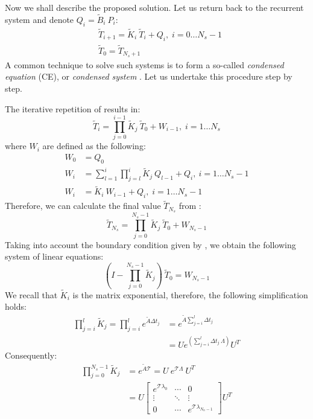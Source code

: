 Now we shall describe the proposed solution. Let us return back to the recurrent system and denote $Q_i = \tilde{B}_i \: P_i$:
\begin{align}
  & \tilde{T}_{i + 1} = \tilde{K}_i \: \tilde{T}_i + Q_i, \; i = 0 \dots N_s - 1 \label{eq:ce-recurrent} \\
  & \tilde{T}_0 = \tilde{T}_{N_s + 1} \nonumber
\end{align}
A common technique to solve such systems is to form a so-called \emph{condensed equation} (CE), or \emph{condensed system} \cite{stoer2002}. Let us undertake this procedure step by step.

The iterative repetition of  results in:
\begin{equation} \label{eq:y-recurrent}
  \tilde{T}_i = \prod_{j = 0}^{i - 1} \tilde{K}_j \: \tilde{T}_0 + W_{i - 1}, \; i = 1 \dots N_s
\end{equation}
where $W_i$ are defined as the following:
\begin{align}
  W_0 & = Q_0 \nonumber \\
  W_i & = \sum_{l = 1}^i \prod_{j = l}^i \tilde{K}_j \: Q_{l - 1} + Q_i, \: i = 1 \dots N_s - 1 \nonumber \\
  W_i & = \tilde{K}_i \: W_{i - 1} + Q_i, \; i = 1 \dots N_s - 1 \label{eq:p-recurrent}
\end{align}
Therefore, we can calculate the final value $\tilde{T}_{N_s}$ from :
\[
  \tilde{T}_{N_s} = \prod_{j = 0}^{N_s - 1} \tilde{K}_j \: \tilde{T}_0 + W_{N_s - 1}
\]
Taking into account the boundary condition given by , we obtain the following system of linear equations:
\begin{equation} \label{eq:core-system}
  (I - \prod_{j = 0}^{N_s - 1} \tilde{K}_j) \: \tilde{T}_0 = W_{N_s - 1}
\end{equation}
We recall that $\tilde{K}_i$ is the matrix exponential, therefore, the following simplification holds:
\begin{align*}
  \prod_{j = i}^l \tilde{K}_j = \prod_{j = i}^l e^{\tilde{A} \Delta t_j} & = e^{\tilde{A} \sum_{j = i}^l \Delta t_j} \\
  & = U e^{\left( \sum_{j = i}^l \Delta t_j \: \Lambda \right)} U^T
\end{align*}
Consequently:
\begin{align*}
  \prod_{j = 0}^{N_s - 1} \tilde{K}_j & = e^{\tilde{A} \mathcal{T}} = U \: e^{\mathcal{T} \Lambda} \: U^T \\
    & = U \left[
      \begin{array}{ccc}
        e^{\mathcal{T} \lambda_0} & \cdots & 0 \\
        \vdots & \ddots & \vdots \\
        0 & \cdots & e^{\mathcal{T} \lambda_{N_n - 1}}
      \end{array}
    \right] U^T
\end{align*}
